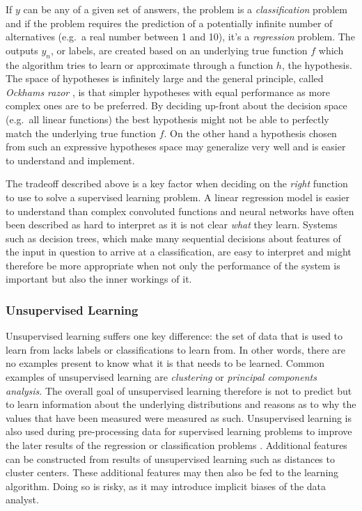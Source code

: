 If $y$ can be any of a given set of answers, the problem is a \emph{classification} problem and if the problem requires the
prediction of a potentially infinite number of alternatives (e.g.\ a real number between 1 and 10), it's a
\emph{regression} problem. The outputs $y_n$, or labels, are created based on an underlying true function $f$ which the
algorithm tries to learn or approximate through a function $h$, the hypothesis. The space of hypotheses is infinitely
large and the general principle, called \emph{Ockhams razor} , is that simpler hypotheses with equal performance as more complex
ones are to be preferred. By deciding up-front about the decision space (e.g.\ all linear functions) the best hypothesis
might not be able to perfectly match the underlying true function $f$. On the other hand a hypothesis chosen from such
an expressive hypotheses space may generalize very well and is easier to understand and implement.

The tradeoff described above is a key factor when deciding on the \emph{right} function to use to solve a supervised
learning problem. A linear regression model is easier to understand than complex convoluted functions and neural
networks have
often been described as hard to interpret as it is not clear \emph{what} they learn. Systems such as decision trees,
which make many sequential decisions about features of the input in question to arrive at a classification, are easy to
interpret and might therefore be more appropriate when not only the performance of the system is important but also the
inner workings of it.


\subsubsection{Unsupervised Learning}
Unsupervised learning suffers one key difference: the set of data that is used to learn from lacks labels or
classifications to learn from. In other words, there are no examples present to know what it is that needs to be
learned. Common examples of unsupervised learning are \emph{clustering} or \emph{principal components analysis}. The
overall goal of unsupervised learning therefore is not to predict but to learn information about the underlying distributions and
reasons as to why the values that have been measured were measured as such. Unsupervised learning is also used during pre-processing
data for supervised learning problems to improve the later results of the regression or classification problems
\cite[p.373f.]{james2013introduction}.
Additional features can be constructed from results of unsupervised learning such as distances to cluster centers. These
additional features may then also be fed to the learning algorithm. Doing so is risky, as it may introduce
implicit biases of the data analyst.

